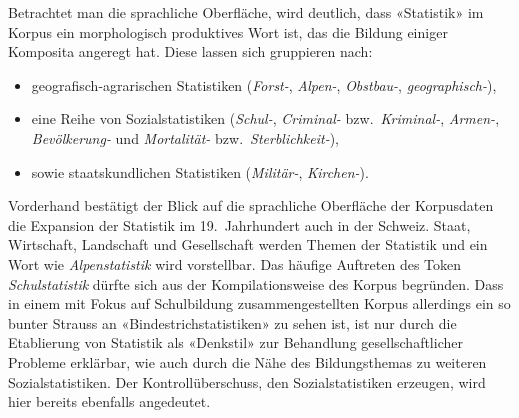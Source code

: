 Betrachtet man die sprachliche Oberfläche, wird deutlich, dass «Statistik» im Korpus ein morphologisch produktives Wort ist, das die Bildung einiger Komposita angeregt hat. Diese lassen sich gruppieren nach:
\begin{itemize}
    \item geografisch-agrarischen Statistiken (\textit{Forst-}, \textit{Alpen-}, \textit{Obstbau-}, \textit{geographisch-}),
    \item eine Reihe von Sozialstatistiken (\textit{Schul-}, \textit{Criminal-} bzw.~\textit{Kriminal-}, \textit{Armen-}, \textit{Bevölkerung-} und \textit{Mortalität-} bzw.~\textit{Sterblichkeit-}),
    \item sowie staatskundlichen Statistiken (\textit{Militär-}, \textit{Kirchen-}).
\end{itemize}

Vorderhand bestätigt der Blick auf die sprachliche Oberfläche der Korpusdaten die Expansion der Statistik im 19.~Jahrhundert auch in der Schweiz. Staat, Wirtschaft, Landschaft und Gesellschaft werden Themen der Statistik und ein Wort wie \textit{Alpenstatistik} wird vorstellbar. Das häufige Auftreten des Token \textit{Schulstatistik} dürfte sich aus der Kompilationsweise des Korpus begründen. Dass in einem mit Fokus auf Schulbildung zusammengestellten Korpus allerdings ein so bunter Strauss an «Bindestrichstatistiken» zu sehen ist, ist nur durch die Etablierung von Statistik als «Denkstil» zur Behandlung gesellschaftlicher Probleme erklärbar, wie auch durch die Nähe des Bildungsthemas zu weiteren Sozialstatistiken. Der Kontrollüberschuss, den Sozialstatistiken erzeugen, wird hier bereits ebenfalls angedeutet.

